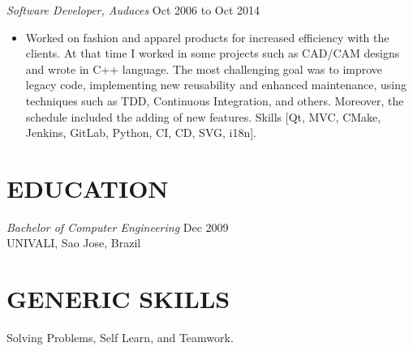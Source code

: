 \documentclass[line,margin]{res}
\begin{document}
\begin{resume}
                {\sl Software Developer, Audaces} \hfill Oct 2006 to Oct 2014 \\
                  \begin{itemize}
                   \item Worked on fashion and apparel products for increased efficiency with the clients. At that time I worked in some projects such as CAD/CAM designs and wrote in C++ language. The most challenging goal was to improve legacy code, implementing new reusability and enhanced maintenance, using techniques such as TDD, Continuous Integration, and others. Moreover, the schedule included the adding of new features. Skills [Qt, MVC, CMake, Jenkins, GitLab, Python, CI, CD, SVG, i18n].
                   \end{itemize}
\section{EDUCATION} {\sl Bachelor of Computer Engineering} \hfill Dec 2009\\
                UNIVALI, Sao Jose, Brazil
\section{GENERIC SKILLS} Solving Problems, Self Learn, and Teamwork.
\end{resume}
\end{document}

